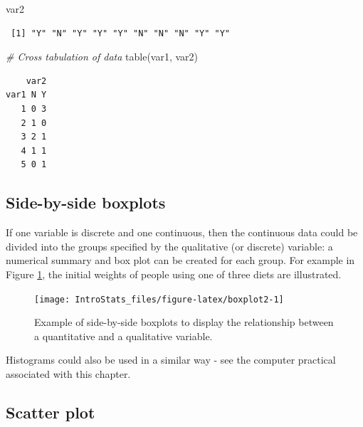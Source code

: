 \documentclass[
  oneside]{krantz}
\newenvironment{Shaded}{\begin{snugshade}}{\end{snugshade}}
\newcommand{\CommentTok}[1]{\textcolor[rgb]{0.56,0.35,0.01}{\textit{#1}}}
\newcommand{\FunctionTok}[1]{\textcolor[rgb]{0.00,0.00,0.00}{#1}}
\newcommand{\NormalTok}[1]{#1}
\begin{document}
\begin{Shaded}
\begin{Highlighting}[]
\NormalTok{var2}
\end{Highlighting}
\end{Shaded}

\begin{verbatim}
 [1] "Y" "N" "Y" "Y" "Y" "N" "N" "N" "Y" "Y"
\end{verbatim}

\begin{Shaded}
\begin{Highlighting}[]
\CommentTok{\# Cross tabulation of data}
\FunctionTok{table}\NormalTok{(var1, var2)}
\end{Highlighting}
\end{Shaded}

\begin{verbatim}
    var2
var1 N Y
   1 0 3
   2 1 0
   3 2 1
   4 1 1
   5 0 1
\end{verbatim}

\hypertarget{side-by-side-boxplots}{%
\subsection{Side-by-side boxplots}\label{side-by-side-boxplots}}

If one variable is discrete and one continuous, then the continuous data could be divided into the groups specified by the qualitative (or discrete) variable: a numerical summary and box plot can be created for each group. For example in Figure \ref{fig:boxplot2}, the initial weights of people using one of three diets are illustrated.

\begin{figure}

{\centering \texttt{[image: IntroStats\_files/figure-latex/boxplot2-1]} 

}

\caption{Example of side-by-side boxplots to display the relationship between a quantitative and a qualitative variable.}\label{fig:boxplot2}
\end{figure}

Histograms could also be used in a similar way - see the computer practical associated with this chapter.

\hypertarget{scatter-plot}{%
\subsection{Scatter plot}\label{scatter-plot}}
\end{document}
